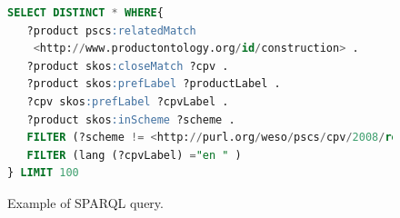 \begin{figure}[!ht]
\begin{lstlisting}[language=SQL,basicstyle=\ttfamily\footnotesize]  
SELECT DISTINCT * WHERE{
   ?product pscs:relatedMatch 
    <http://www.productontology.org/id/construction> .
   ?product skos:closeMatch ?cpv .
   ?product skos:prefLabel ?productLabel .
   ?cpv skos:prefLabel ?cpvLabel .
   ?product skos:inScheme ?scheme .
   FILTER (?scheme != <http://purl.org/weso/pscs/cpv/2008/resource/ds>) .
   FILTER (lang (?cpvLabel) ="en " )
} LIMIT 100
\end{lstlisting}
\caption{Example of SPARQL query.}
 \label{fig:example-sparql-query}
\end{figure}

